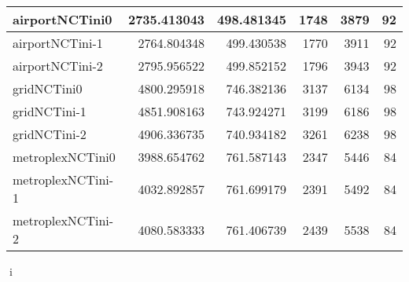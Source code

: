 \begin{longtable}{|l|r|r|r|r|r|}
airportNCTini0 & 2735.413043 & 498.481345 & 1748 & 3879 & 92 \\ \hline
airportNCTini-1 & 2764.804348 & 499.430538 & 1770 & 3911 & 92 \\ \hline
airportNCTini-2 & 2795.956522 & 499.852152 & 1796 & 3943 & 92 \\ \hline
gridNCTini0 & 4800.295918 & 746.382136 & 3137 & 6134 & 98 \\ \hline
gridNCTini-1 & 4851.908163 & 743.924271 & 3199 & 6186 & 98 \\ \hline
gridNCTini-2 & 4906.336735 & 740.934182 & 3261 & 6238 & 98 \\ \hline
metroplexNCTini0 & 3988.654762 & 761.587143 & 2347 & 5446 & 84 \\ \hline
metroplexNCTini-1 & 4032.892857 & 761.699179 & 2391 & 5492 & 84 \\ \hline
metroplexNCTini-2 & 4080.583333 & 761.406739 & 2439 & 5538 & 84 \\ \hline
\end{longtable}
i
